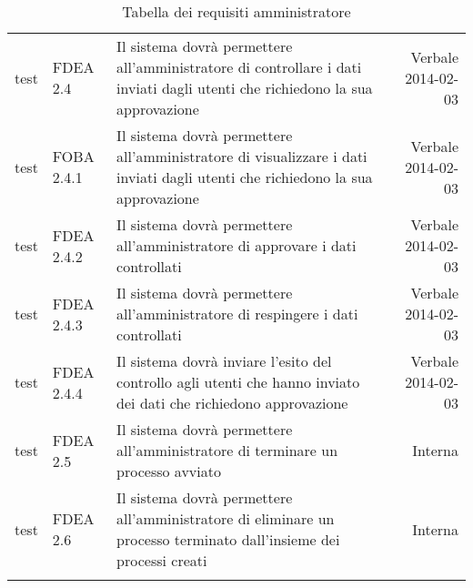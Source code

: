 \begin{longtable}{lXXr}
\midrule
test&FDEA 2.4&Il sistema dovrà permettere all'amministratore di controllare i dati inviati dagli utenti che richiedono la sua approvazione& Verbale 2014-02-03\\
test&FOBA 2.4.1&Il sistema dovrà permettere all'amministratore di visualizzare i dati inviati dagli utenti che richiedono la sua approvazione&Verbale 2014-02-03\\
\midrule
test&FDEA 2.4.2&Il sistema dovrà permettere all'amministratore di approvare i dati controllati&Verbale 2014-02-03\\
\midrule
test&FDEA 2.4.3&Il sistema dovrà permettere all'amministratore di respingere i dati controllati&Verbale 2014-02-03\\
\midrule
test&FDEA 2.4.4&Il sistema dovrà inviare l'esito del controllo agli utenti che hanno inviato dei dati che richiedono approvazione&Verbale 2014-02-03\\
\midrule
test&FDEA 2.5&Il sistema dovrà permettere all'amministratore di terminare un processo avviato&Interna\\
\midrule
test&FDEA 2.6&Il sistema dovrà permettere all'amministratore di eliminare un processo terminato dall'insieme dei processi creati&Interna\\ 
\bottomrule
\caption{Tabella dei requisiti amministratore}
\end{longtable}